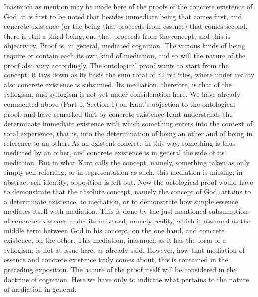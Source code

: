 Inasmuch as mention may be made here of
the proofs of the concrete existence of God,
it is first to be noted that besides
immediate being that comes first,
and concrete existence
(or the being that proceeds from essence)
that comes second, there is still a third being,
one that proceeds from the concept,
and this is objectivity.
Proof is, in general, mediated cognition.
The various kinds of being require or contain
each its own kind of mediation,
and so will the nature of the proof also vary accordingly.
The ontological proof wants to start from the concept;
it lays down as its basis the sum total of all realities,
where under reality also concrete existence is subsumed.
Its mediation, therefore, is that of the syllogism,
and syllogism is not yet under consideration here.
We have already commented above (Part 1, Section 1)
on Kant's objection to the ontological proof,
and have remarked that by concrete existence
Kant understands the determinate immediate existence
with which something enters into the context of total experience,
that is, into the determination of being an other
and of being in reference to an other.
As an existent concrete in this way,
something is thus mediated by an other,
and concrete existence is in general the side of its mediation.
But in what Kant calls the concept, namely,
something taken as only simply self-referring,
or in representation as such, this mediation is missing;
in abstract self-identity, opposition is left out.
Now the ontological proof would have
to demonstrate that the absolute concept,
namely the concept of God,
attains to a determinate existence, to mediation,
or to demonstrate how simple essence
mediates itself with mediation.
This is done by the just mentioned
subsumption of concrete existence
under its universal, namely reality,
which is assumed as the middle term
between God in his concept, on the one hand,
and concrete existence, on the other.
This mediation, inasmuch as it has the form of a syllogism,
is not at issue here, as already said.
However, how that mediation of essence and concrete existence truly
comes about, this is contained in the preceding exposition.
The nature of the proof itself will be considered
in the doctrine of cognition.
Here we have only to indicate what pertains
to the nature of mediation in general.

